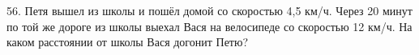 56. Петя вышел из школы и пошёл домой со скоростью 4,5 км/ч. Через 20 минут по той же дороге из школы выехал Вася на велосипеде со скоростью 12 км/ч. На каком расстоянии от школы Вася догонит Петю?\\
